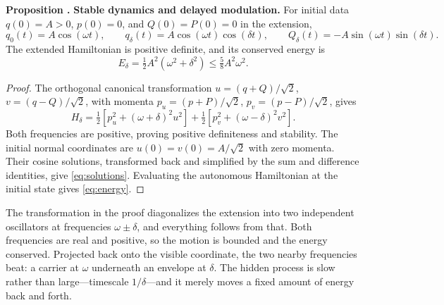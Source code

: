 \documentclass[10pt]{article}
\newcounter{claim}
\newcommand{\claim}[2]{\refstepcounter{claim}\label{#1}\textbf{#2 \theclaim.}}
\begin{document}
\begin{resultbox}
\claim{prop:modes}{Proposition} \textbf{Stable dynamics and delayed modulation.}
For initial data $q(0)=A>0$, $p(0)=0$, and $Q(0)=P(0)=0$ in the extension,
\begin{equation}
q_0(t)=A\cos(\omega t),\qquad
q_\delta(t)=A\cos(\omega t)\cos(\delta t),\qquad
Q_\delta(t)=-A\sin(\omega t)\sin(\delta t).
\label{eq:solutions}
\end{equation}
The extended Hamiltonian is positive definite, and its conserved energy is
\begin{equation}
E_\delta=\tfrac12A^2(\omega^2+\delta^2)
\leq\tfrac58 A^2\omega^2.
\label{eq:energy}
\end{equation}
\end{resultbox}
\begin{proof}
The orthogonal canonical transformation
$u=(q+Q)/\sqrt2$, $v=(q-Q)/\sqrt2$, with momenta
$p_u=(p+P)/\sqrt2$, $p_v=(p-P)/\sqrt2$, gives
\[
H_\delta=\tfrac12[p_u^2+(\omega+\delta)^2u^2]
          +\tfrac12[p_v^2+(\omega-\delta)^2v^2].
\]
Both frequencies are positive, proving positive definiteness and stability.
The initial normal coordinates are $u(0)=v(0)=A/\sqrt2$ with zero momenta.
Their cosine solutions, transformed back and simplified by the sum and
difference identities, give \eqref{eq:solutions}. Evaluating the autonomous
Hamiltonian at the initial state gives \eqref{eq:energy}.
\end{proof}

The transformation in the proof diagonalizes the extension into two
independent oscillators at frequencies $\omega\pm\delta$, and everything follows
from that. Both frequencies are real and positive, so the motion is bounded and
the energy conserved. Projected back onto the visible coordinate, the two nearby
frequencies beat: a carrier at $\omega$ underneath an envelope at $\delta$. The
hidden process is slow rather than large---timescale $1/\delta$---and it merely
moves a fixed amount of energy back and forth.
\end{document}
